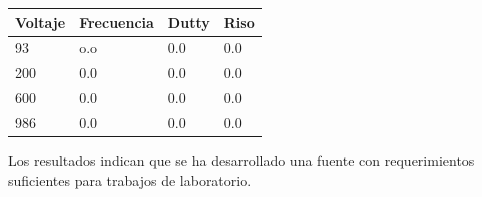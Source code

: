 \begin{table}[H]
\begin{tabular}{@{}llll@{}}
\toprule
Voltaje   & Frecuencia & Dutty & Riso \\ \midrule
93  & o.o        & 0.0   &  0.0\\
200 & 0.0        & 0.0   &   0.0\\
600 & 0.0        & 0.0   &   0.0\\
986 & 0.0        & 0.0   &   0.0\\ \bottomrule
\end{tabular}
\end{table}


Los resultados indican que se ha desarrollado una fuente con requerimientos suficientes para trabajos de laboratorio. 